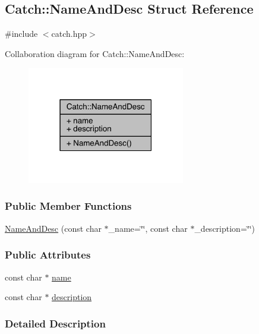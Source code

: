 \hypertarget{a00053}{}\subsection{Catch\+:\+:Name\+And\+Desc Struct Reference}
\label{a00053}


{\ttfamily \#include $<$catch.\+hpp$>$}



Collaboration diagram for Catch\+:\+:Name\+And\+Desc\+:\nopagebreak
\begin{figure}[H]
\begin{center}
\leavevmode
\includegraphics[width=195pt]{a00235}
\end{center}
\end{figure}
\subsubsection*{Public Member Functions}
\begin{DoxyCompactItemize}
\item 
\hyperlink{a00053_a189ceb9942fb5f6635140d6a09fc843a}{Name\+And\+Desc} (const char $\ast$\+\_\+name=\char`\"{}\char`\"{}, const char $\ast$\+\_\+description=\char`\"{}\char`\"{})
\end{DoxyCompactItemize}
\subsubsection*{Public Attributes}
\begin{DoxyCompactItemize}
\item 
const char $\ast$ \hyperlink{a00053_a374b4ed8be3cf98be20ebde5273bde51}{name}
\item 
const char $\ast$ \hyperlink{a00053_a3463a23ff65ce494fc380452b57b7970}{description}
\end{DoxyCompactItemize}


\subsubsection{Detailed Description}


